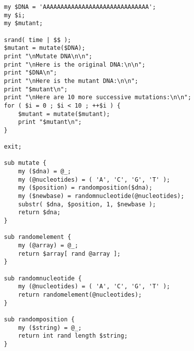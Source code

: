 \documentclass{TIJMUjiaoanSY}
\begin{document}
\begin{enumerate}
\begin{enumerate}
\begin{verbatim}
my $DNA = 'AAAAAAAAAAAAAAAAAAAAAAAAAAAAAA';
my $i;
my $mutant;

srand( time | $$ );
$mutant = mutate($DNA);
print "\nMutate DNA\n\n";
print "\nHere is the original DNA:\n\n";
print "$DNA\n";
print "\nHere is the mutant DNA:\n\n";
print "$mutant\n";
print "\nHere are 10 more successive mutations:\n\n";
for ( $i = 0 ; $i < 10 ; ++$i ) {
    $mutant = mutate($mutant);
    print "$mutant\n";
}

exit;

sub mutate {
    my ($dna) = @_;
    my (@nucleotides) = ( 'A', 'C', 'G', 'T' );
    my ($position) = randomposition($dna);
    my ($newbase) = randomnucleotide(@nucleotides);
    substr( $dna, $position, 1, $newbase );
    return $dna;
}

sub randomelement {
    my (@array) = @_;
    return $array[ rand @array ];
}

sub randomnucleotide {
    my (@nucleotides) = ( 'A', 'C', 'G', 'T' );
    return randomelement(@nucleotides);
}

sub randomposition {
    my ($string) = @_;
    return int rand length $string;
}
\end{verbatim}
    \end{enumerate}
\end{enumerate}

\otherTail
\end{document}
